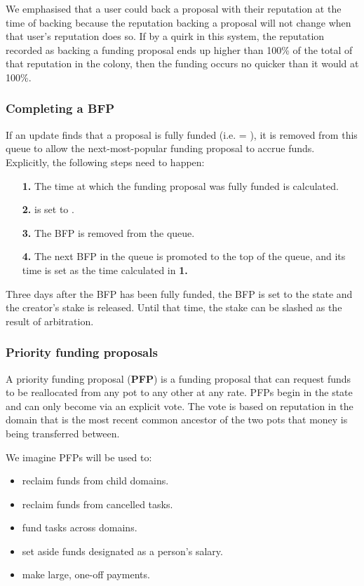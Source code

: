 We emphasised that a user could back a proposal with their reputation at the time of backing because the reputation backing a proposal will not change when that user's reputation does so. If by a quirk in this system, the reputation recorded as backing a funding proposal ends up higher than 100\% of the total of that reputation in the colony, then the funding occurs no quicker than it would at 100\%.

\subsubsection{Completing a BFP}
If an update finds that a proposal is fully funded (i.e.  = ), it is removed from this queue to allow the next-most-popular funding proposal to accrue funds. Explicitly, the following steps need to happen:
\begin{itemize}
 \item[\textbf{1.}] The time at which the funding proposal was fully funded is calculated.%
 \item[\textbf{2.}]  is set to .
 \item[\textbf{3.}] The BFP is removed from the queue.
 \item[\textbf{4.}] The next BFP in the queue is promoted to the top of the queue, and its  time is set as the time calculated in \textbf{1.}
\end{itemize}

Three days after the BFP has been fully funded, the BFP is set to the  state and the creator's stake is released. Until that time, the stake can be slashed as the result of arbitration.


\subsubsection{Priority funding proposals}
A priority funding proposal (\textbf{PFP}) is a funding proposal that can request funds to be reallocated from any pot to any other at any rate. PFPs begin in the  state and can only become  via an explicit vote. The vote is based on reputation in the domain that is the most recent common ancestor of the two pots that money is being transferred between.

We imagine PFPs will be used to:
\begin{itemize}
 \item reclaim funds from child domains.
 \item reclaim funds from cancelled tasks.
 \item fund tasks across domains.
 \item set aside funds designated as a person's salary.
 \item make large, one-off payments.
 \end{itemize}


